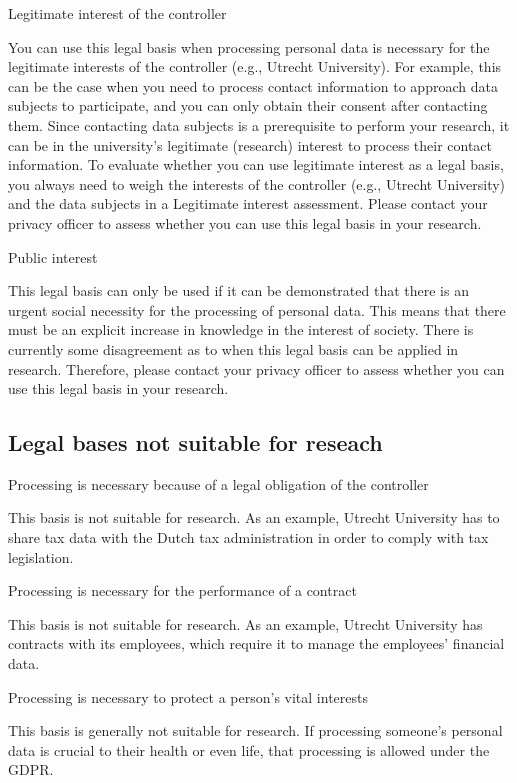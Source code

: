 \documentclass[
]{book}
\begin{document}
Legitimate interest of the controller

You can use this legal basis when processing personal data is necessary
for the legitimate interests of the controller (e.g., Utrecht University).
For example, this can be the case when you need to process contact
information to approach data subjects to participate, and you can only
obtain their consent after contacting them. Since contacting data subjects
is a prerequisite to perform your research, it can be in the university's
legitimate (research) interest to process their contact information. To
evaluate whether you can use legitimate interest as a legal basis, you
always need to weigh the interests of the controller (e.g., Utrecht
University) and the data subjects in a
Legitimate interest assessment.
Please contact your privacy officer to assess whether you can use this
legal basis in your research.

Public interest

This legal basis can only be used if it can be demonstrated that there
is an urgent social necessity for the processing of personal data. This
means that there must be an explicit increase in knowledge in the
interest of society. There is currently some disagreement as to when this
legal basis can be applied in research. Therefore, please contact your
privacy officer
to assess whether you can use this legal basis in your research.

\hypertarget{legal-bases-not-suitable-for-reseach}{%
\subsection{Legal bases not suitable for reseach}\label{legal-bases-not-suitable-for-reseach}}

Processing is necessary because of a legal obligation of the controller

This basis is not suitable for research. As an example, Utrecht
University has to share tax data with the Dutch tax administration in
order to comply with tax legislation.

Processing is necessary for the performance of a contract

This basis is not suitable for research. As an example, Utrecht
University has contracts with its employees, which require it to manage
the employees' financial data.

Processing is necessary to protect a person's vital interests

This basis is generally not suitable for research. If processing
someone's personal data is crucial to their health or even life, that
processing is allowed under the GDPR.
\end{document}
